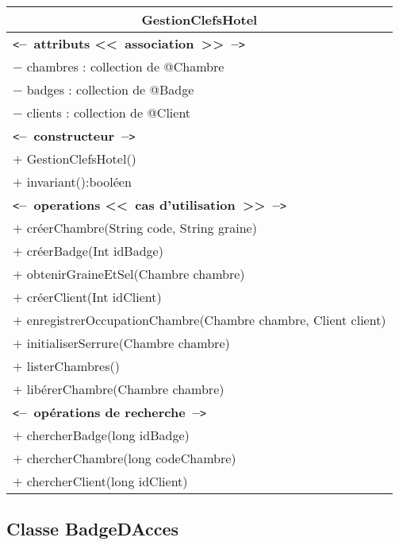 \documentclass[11pt,article]{article}
\newcommand{\cmt}[1]{\texttt{<}\textbf{--~#1~--}\texttt{>}}
\begin{document}
  \begin{center}
	  \begin{longtable}{|p{15cm}|}
		  \hline
		  \multicolumn{1}{|c|}{{\Large \textsf{GestionClefsHotel}}} \\
		  \hline
		  \cmt{attributs <<~association~>>}\\
		  $-$ chambres : collection de @Chambre \\
		  $-$ badges : collection de @Badge \\
		  $-$ clients : collection de @Client \\

		  \hline
		  \cmt{constructeur} \\
		  $+$ GestionClefsHotel()\\
		  $+$ invariant():booléen\\
		  \cmt{operations <<~cas d'utilisation~>>} \\
		  $+$ créerChambre(String code, String graine) \\
		  $+$ créerBadge(Int idBadge) \\
		  $+$ obtenirGraineEtSel(Chambre chambre) \\
		  $+$ créerClient(Int idClient) \\
		  $+$ enregistrerOccupationChambre(Chambre chambre, Client client) \\
		  $+$ initialiserSerrure(Chambre chambre) \\
		  $+$ listerChambres() \\
		  $+$ libérerChambre(Chambre chambre) \\
		  \cmt{opérations de recherche} \\
		  $+$ chercherBadge(long idBadge) \\
		  $+$ chercherChambre(long codeChambre) \\
		  $+$ chercherClient(long idClient) \\
		  \hline
	  \end{longtable}%
  \end{center}

  \subsection{Classe \textsf{BadgeDAcces}}
\end{document}
